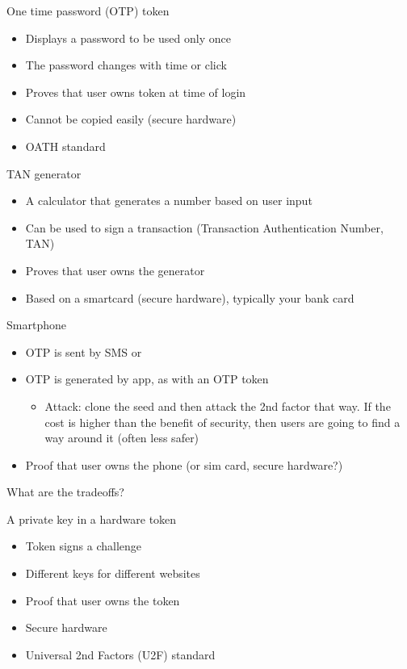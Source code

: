 \documentclass[11pt]{article}
\begin{document}
One time password (OTP) token

\begin{itemize}
	\item Displays a password to be used only once
	\item The password changes with time or click
	\item Proves that user owns token at time of login
	\item Cannot be copied easily (secure hardware)
	\item OATH standard
\end{itemize}

TAN generator
\begin{itemize}
	\item A calculator that generates a number based on user input
	\item Can be used to sign a transaction (Transaction Authentication Number, TAN)
	\item Proves that user owns the generator
	\item Based on a smartcard (secure hardware), typically your bank card
\end{itemize}

Smartphone
\begin{itemize}
	\item OTP is sent by SMS or
	\item OTP is generated by app, as with an OTP token
		\begin{itemize}
			\item Attack: clone the seed and then attack the 2nd factor that way. If the cost is higher than the benefit of security, then users are going to find a way around it (often less safer)
		\end{itemize}
	\item Proof that user owns the phone (or sim card, secure hardware?)
\end{itemize}

\begin{tcolorbox}[
  colback=orange!15,     %
  colframe=black!50,    %
  boxrule=1pt,       %
  arc=3mm,             %
  left=4mm, right=4mm, top=2mm, bottom=2mm %
]
What are the tradeoffs?
\end{tcolorbox}


A private key in a hardware token
\begin{itemize}
	\item Token signs a challenge
	\item Different keys for different websites
	\item Proof that user owns the token
	\item Secure hardware
	\item Universal 2nd Factors (U2F) standard
\end{itemize}
\end{document}
